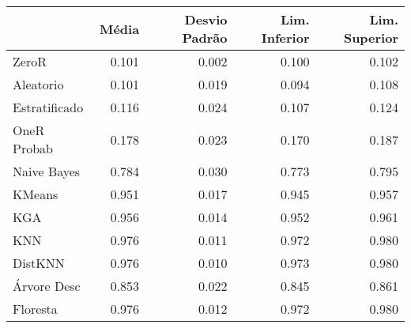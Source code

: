 \begin{table}
\centering
\label{Digits_status_table}
\begin{tabular}{lrrrr}
\toprule
{} & Média & Desvio Padrão & Lim. Inferior & Lim. Superior \\
\midrule
ZeroR         & 0.101 &         0.002 &         0.100 &         0.102 \\
Aleatorio     & 0.101 &         0.019 &         0.094 &         0.108 \\
Estratificado & 0.116 &         0.024 &         0.107 &         0.124 \\
OneR Probab   & 0.178 &         0.023 &         0.170 &         0.187 \\
Naive Bayes   & 0.784 &         0.030 &         0.773 &         0.795 \\
KMeans        & 0.951 &         0.017 &         0.945 &         0.957 \\
KGA           & 0.956 &         0.014 &         0.952 &         0.961 \\
KNN           & 0.976 &         0.011 &         0.972 &         0.980 \\
DistKNN       & 0.976 &         0.010 &         0.973 &         0.980 \\
Árvore Desc   & 0.853 &         0.022 &         0.845 &         0.861 \\
Floresta      & 0.976 &         0.012 &         0.972 &         0.980 \\
\bottomrule
\end{tabular}
\end{table}
